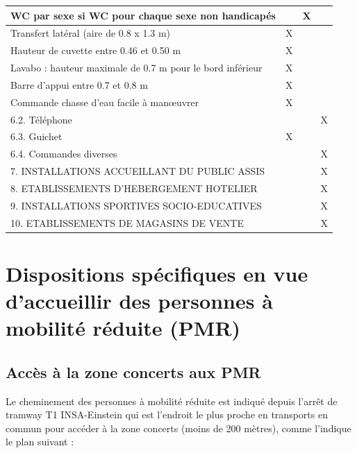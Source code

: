 \documentclass[hidelinks, paper=a4, fontsize=13pt]{report}
\begin{document}
\begin{center}
\begin{tabular}{ | p{13cm} | p{1cm} | p{1cm} | p{1cm} | }
	WC par sexe si WC pour chaque sexe non handicapés &  & X &  \\ \hline
	Transfert latéral (aire de 0.8 x 1.3 m) & X &  &  \\ \hline
	Hauteur de cuvette entre 0.46 et 0.50 m & X &  &  \\ \hline
	Lavabo : hauteur maximale de 0.7 m pour le bord inférieur & X &  &  \\ \hline
	Barre d’appui entre 0.7 et 0.8 m & X &  &  \\ \hline
	Commande chasse d’eau facile à manœuvrer & X &  &  \\ \hline
	6.2. Téléphone &  &  & X \\ \hline
	6.3. Guichet & X &  &  \\ \hline
	6.4. Commandes diverses &  &  & X \\ \hline
	7. INSTALLATIONS ACCUEILLANT DU PUBLIC ASSIS &  &  & X \\ \hline
	8. ETABLISSEMENTS D’HEBERGEMENT HOTELIER &  &  & X \\ \hline
	9. INSTALLATIONS SPORTIVES SOCIO-EDUCATIVES &  &  & X \\ \hline
	10. ETABLISSEMENTS DE MAGASINS DE VENTE &  &  & X \\ \hline
\end{tabular}

\end{center}
\newpage
\section{Dispositions spécifiques en vue d’accueillir des personnes à mobilité réduite (PMR)}

\subsection{Accès à la zone concerts aux PMR}

Le cheminement des personnes à mobilité réduite est indiqué depuis l’arrêt de tramway T1 INSA-Einstein qui est l’endroit le plus proche en transports en commun pour accéder à la zone concerts (moins de 200 mètres), comme l’indique le plan suivant :
\end{document}
